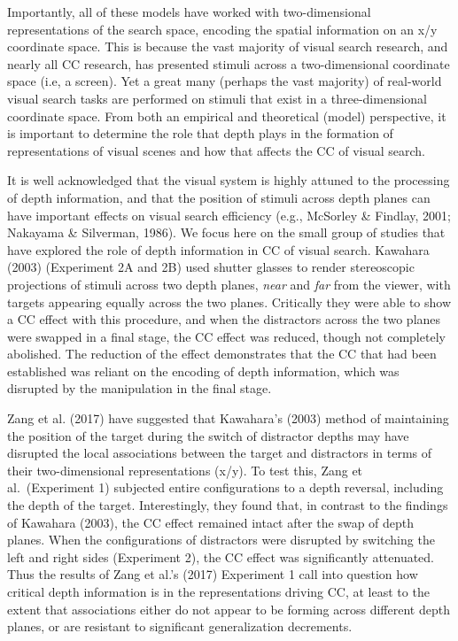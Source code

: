\documentclass[
  man,floatsintext]{apa7}
\begin{document}
Importantly, all of these models have worked with two-dimensional representations of the search space, encoding the spatial information on an x/y coordinate space. This is because the vast majority of visual search research, and nearly all CC research, has presented stimuli across a two-dimensional coordinate space (i.e, a screen). Yet a great many (perhaps the vast majority) of real-world visual search tasks are performed on stimuli that exist in a three-dimensional coordinate space. From both an empirical and theoretical (model) perspective, it is important to determine the role that depth plays in the formation of representations of visual scenes and how that affects the CC of visual search.

It is well acknowledged that the visual system is highly attuned to the processing of depth information, and that the position of stimuli across depth planes can have important effects on visual search efficiency (e.g., McSorley \& Findlay, 2001; Nakayama \& Silverman, 1986). We focus here on the small group of studies that have explored the role of depth information in CC of visual search. Kawahara (2003) (Experiment 2A and 2B) used shutter glasses to render stereoscopic projections of stimuli across two depth planes, \emph{near} and \emph{far} from the viewer, with targets appearing equally across the two planes. Critically they were able to show a CC effect with this procedure, and when the distractors across the two planes were swapped in a final stage, the CC effect was reduced, though not completely abolished. The reduction of the effect demonstrates that the CC that had been established was reliant on the encoding of depth information, which was disrupted by the manipulation in the final stage.

Zang et al. (2017) have suggested that Kawahara's (2003) method of maintaining the position of the target during the switch of distractor depths may have disrupted the local associations between the target and distractors in terms of their two-dimensional representations (x/y). To test this, Zang et al.~(Experiment 1) subjected entire configurations to a depth reversal, including the depth of the target. Interestingly, they found that, in contrast to the findings of Kawahara (2003), the CC effect remained intact after the swap of depth planes. When the configurations of distractors were disrupted by switching the left and right sides (Experiment 2), the CC effect was significantly attenuated. Thus the results of Zang et al.'s (2017) Experiment 1 call into question how critical depth information is in the representations driving CC, at least to the extent that associations either do not appear to be forming across different depth planes, or are resistant to significant generalization decrements.
\end{document}
